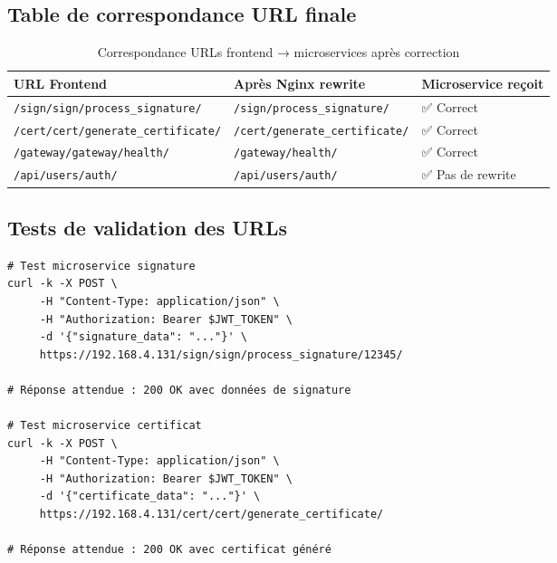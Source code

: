 \documentclass[12pt,a4paper]{article}
\begin{document}
\subsection{Table de correspondance URL finale}

\begin{table}[H]
\centering
\caption{Correspondance URLs frontend → microservices après correction}
\label{tab:url_mapping_final}
\begin{tabularx}{\textwidth}{|X|X|X|}
\hline
\textbf{URL Frontend} & \textbf{Après Nginx rewrite} & \textbf{Microservice reçoit} \\
\hline
\texttt{/sign/sign/process\_signature/} & \texttt{/sign/process\_signature/} & ✅ Correct \\
\hline
\texttt{/cert/cert/generate\_certificate/} & \texttt{/cert/generate\_certificate/} & ✅ Correct \\
\hline
\texttt{/gateway/gateway/health/} & \texttt{/gateway/health/} & ✅ Correct \\
\hline
\texttt{/api/users/auth/} & \texttt{/api/users/auth/} & ✅ Pas de rewrite \\
\hline
\end{tabularx}
\end{table}

\subsection{Tests de validation des URLs}

\begin{lstlisting}[style=bash, caption={Tests des URLs corrigées}]
# Test microservice signature
curl -k -X POST \
     -H "Content-Type: application/json" \
     -H "Authorization: Bearer $JWT_TOKEN" \
     -d '{"signature_data": "..."}' \
     https://192.168.4.131/sign/sign/process_signature/12345/

# Réponse attendue : 200 OK avec données de signature

# Test microservice certificat  
curl -k -X POST \
     -H "Content-Type: application/json" \
     -H "Authorization: Bearer $JWT_TOKEN" \
     -d '{"certificate_data": "..."}' \
     https://192.168.4.131/cert/cert/generate_certificate/

# Réponse attendue : 200 OK avec certificat généré
\end{lstlisting}

\end{document}
